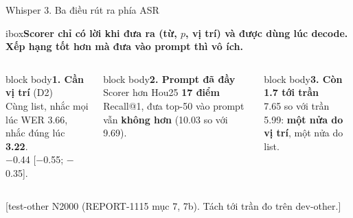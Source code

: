 \documentclass[aspectratio=169,xcolor=table]{beamer}
\newcommand{\bad}[1]{\textcolor{RiskRed}{\textbf{#1}}}
\newcommand{\good}[1]{\textcolor{GoodGreen}{\textbf{#1}}}
\newcommand{\src}[1]{\par\vfill{\tiny\color{TextGray}[#1]}}
\newcommand{\nbox}[2][block body]{\begin{beamercolorbox}[sep=0.45em,rounded=true]{#1}\footnotesize #2\end{beamercolorbox}}
\newcommand{\nb}[1]{\textcolor{Accent}{#1}}
\newcommand{\insight}[1]{\begin{beamercolorbox}[sep=0.55em,rounded=true]{ibox}\small\bfseries #1\end{beamercolorbox}\vspace{0.15cm}}
\begin{document}
\begin{frame}{Whisper 3. Ba điều rút ra phía ASR}
\insight{Scorer chỉ có lời khi đưa ra \nb{(từ, $p$, vị trí)} và được dùng \nb{lúc decode}. Xếp hạng tốt hơn mà đưa vào prompt thì vô ích.}
\begin{columns}[T]
\nbox{\textbf{1. Cần vị trí} (D2)\\[2pt]
Cùng list, nhắc mọi lúc WER 3.66, nhắc đúng lúc \good{3.22}.\\
$-$0.44 [$-$0.55; $-$0.35].}
\nbox{\textbf{2. Prompt đã đầy}\\[2pt]
Scorer hơn Hou25 \textbf{17 điểm} Recall@1, đưa top-50 vào prompt vẫn \bad{không hơn} (10.03 so với 9.69).}
\nbox{\textbf{3. Còn 1.7 tới trần}\\[2pt]
7.65 so với trần 5.99: \textbf{một nửa do vị trí}, một nửa do list.}
\end{columns}
\src{test-other N2000 (REPORT-1115 mục 7, 7b). Tách tới trần đo trên dev-other.}
\end{frame}
\end{document}
